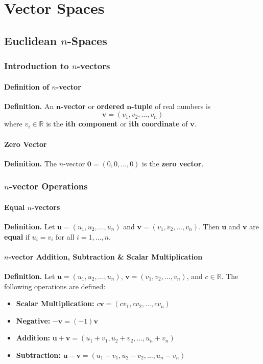 \documentclass[../ma2001_notes.tex]{subfiles}
\begin{document}
\chapter{Vector Spaces}

\section{Euclidean $n$-Spaces}
\subsection{Introduction to $n$-vectors}
\subsubsection{Definition of $n$-vector}
\textbf{Definition.} An \(\bm{n}\)\textbf{-vector} or \textbf{ordered} \(\bm{n}\)\textbf{-tuple} of real numbers is
\[\bm{v}=(v_1, v_2, \ldots, v_n)\]
where \(v_i\in\mathbb{R}\) is the \(\bm{i}\)\textbf{th component} or \(\bm{i}\)\textbf{th coordinate} of \(\bm{v}\).

\subsubsection{Zero Vector}
\textbf{Definition.} The \(n\)-vector \(\bm{0}=(0,0,\ldots,0)\) is the \textbf{zero vector}.

\subsection{$n$-vector Operations}
\subsubsection{Equal $n$-vectors}
\textbf{Definition.} Let \(\bm{u}=(u_1,u_2,\ldots,u_n)\) and \(\bm{v}=(v_1,v_2,\ldots,v_n)\). Then \(\bm{u}\) and \(\bm{v}\) are \textbf{equal} if \(u_i=v_i\) for all \(i=1,\ldots,n\).

\subsubsection{$n$-vector Addition, Subtraction \& Scalar Multiplication}
\textbf{Definition.} Let \(\bm{u}=(u_1,u_2,\ldots,u_n)\), \(\bm{v}=(v_1,v_2,\ldots,v_n)\), and \(c\in\mathbb{R}\). The following operations are defined:
\begin{itemize}
	\item\textbf{Scalar Multiplication:} \(c\bm{v}=(cv_1,cv_2,\ldots,cv_n)\)
	\item\textbf{Negative:} \(-\bm{v}=(-1)\bm{v}\)
	\item\textbf{Addition:} \(\bm{u}+\bm{v}=(u_1+v_1,u_2+v_2,\ldots,u_n+v_n)\)
	\item\textbf{Subtraction:} \(\bm{u}-\bm{v}=(u_1-v_1,u_2-v_2,\ldots,u_n-v_n)\)
\end{itemize}
\end{document}
